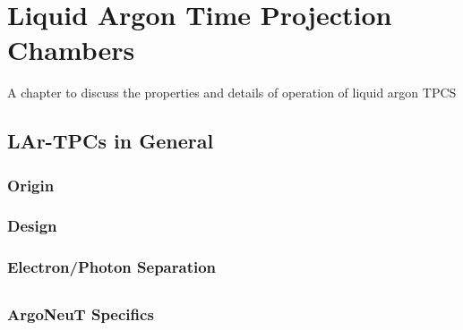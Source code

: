 \chapter{Liquid Argon Time Projection Chambers}

A chapter to discuss the properties and details of operation of liquid argon TPCS

\xspace

\section{LAr-TPCs in General}

\subsection{Origin}

\subsection{Design}

\subsection{Electron/Photon Separation}

\section{\argoneut}

\subsection{ArgoNeuT Specifics}
